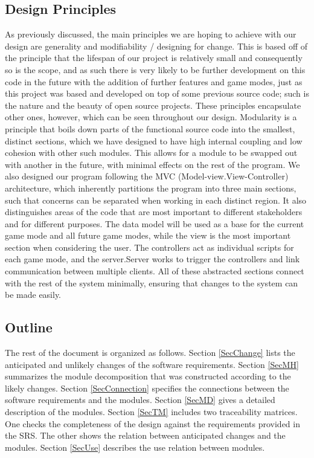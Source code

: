 \documentclass[12pt, titlepage]{article}
\begin{document}
\subsection{Design Principles}

As previously discussed, the main principles we are hoping to achieve with our design are generality and modifiability / designing for change. This is based off of the principle that the lifespan of our project is relatively small and consequently so is the scope, and as such there is very likely to be further development on this code in the future with the addition of further features and game modes, just as this project was based and developed on top of some previous source code; such is the nature and the beauty of open source projects. These principles encapsulate other ones, however, which can be seen throughout our design. Modularity is a principle that boils down parts of the functional source code into the smallest, distinct sections, which we have designed to have high internal coupling and low cohesion with other such modules. This allows for a module to be swapped out with another in the future, with minimal effects on the rest of the program. We also designed our program following the MVC (Model-view.View-Controller) architecture, which inherently partitions the program into three main sections, such that concerns can be separated when working in each distinct region. It also distinguishes areas of the code that are most important to different stakeholders and for different purposes. The data model will be used as a base for the current game mode and all future game modes, while the view is the most important section when considering the user. The controllers act as individual scripts for each game mode, and the server.Server works to trigger the controllers and link communication between multiple clients. All of these abstracted sections connect with the rest of the system minimally, ensuring that changes to the system can be made easily.

\subsection{Outline}

The rest of the document is organized as follows. Section
\ref{SecChange} lists the anticipated and unlikely changes of the software
requirements. Section \ref{SecMH} summarizes the module decomposition that
was constructed according to the likely changes. Section \ref{SecConnection}
specifies the connections between the software requirements and the
modules. Section \ref{SecMD} gives a detailed description of the
modules. Section \ref{SecTM} includes two traceability matrices. One checks
the completeness of the design against the requirements provided in the SRS. The
other shows the relation between anticipated changes and the modules. Section
\ref{SecUse} describes the use relation between modules.
\end{document}
